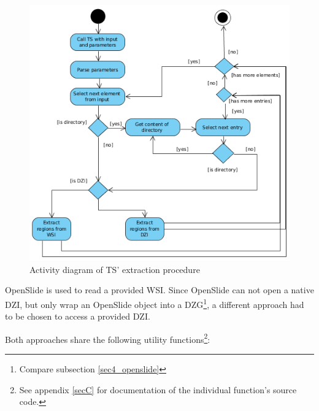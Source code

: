 \begin{figure}[H]
	\begin{center}
		\includegraphics[scale=0.6]{img/ts_run.png}
		\caption{Activity diagram of TS' extraction procedure}
		\label{fig5_tsRunUml}
	\end{center}
\end{figure}

OpenSlide is used to read a provided WSI. Since OpenSlide can not open a native DZI, but only wrap an OpenSlide object into a DZG\footnote{
	Compare subsection \ref{sec4_openslide}
}, a different approach had to be chosen to access a provided DZI.

Both approaches share the following utility functions\footnote{
	See appendix \ref{secC} for documentation of the individual function's source code.
}:


